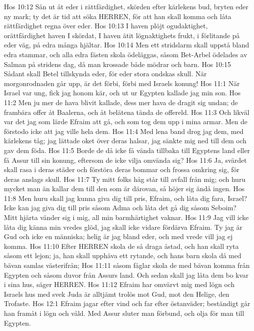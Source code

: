 Hos 10:12  Sån ut åt eder i rättfärdighet, skörden efter kärlekens bud, bryten eder ny mark; ty det är tid att söka HERREN, för att han skall komma och låta rättfärdighet regna över eder.
Hos 10:13  I haven plöjt ogudaktighet, orättfärdighet haven I skördat, I haven ätit lögnaktighets frukt, i förlitande på eder väg, på edra många hjältar.
Hos 10:14  Men ett stridslarm skall uppstå bland edra stammar, och alla edra fästen skola ödeläggas, såsom Bet-Arbel ödelades av Salman på stridens dag, då man krossade både mödrar och barn.
Hos 10:15  Sådant skall Betel tillskynda eder, för eder stora ondskas skull. När morgonrodnaden går upp, är det förbi, förbi med Israels konung!
Hos 11:1  När Israel var ung, fick jag honom kär, och ut ur Egypten kallade jag min son.
Hos 11:2  Men ju mer de hava blivit kallade, dess mer hava de dragit sig undan; de frambära offer åt Baalerna, och åt belätena tända de offereld.
Hos 11:3  Och likväl var det jag som lärde Efraim att gå, och som tog dem upp i mina armar. Men de förstodo icke att jag ville hela dem.
Hos 11:4  Med lena band drog jag dem, med kärlekens tåg; jag lättade oket över deras halsar, jag sänkte mig ned till dem och gav dem föda.
Hos 11:5  Borde de då icke få vända tillbaka till Egyptens land eller få Assur till sin konung, eftersom de icke vilja omvända sig?
Hos 11:6  Ja, svärdet skall rasa i deras städer och förstöra deras bommar och frossa omkring sig, för deras anslags skull.
Hos 11:7  Ty mitt folks håg står till avfall från mig; och huru mycket man än kallar dem till den som är därovan, så höjer sig ändå ingen.
Hos 11:8  Men huru skall jag kunna giva dig till pris, Efraim, och låta dig fara, Israel? Icke kan jag giva dig till pris såsom Adma och låta det gå dig såsom Seboim? Mitt hjärta vänder sig i mig, all min barmhärtighet vaknar.
Hos 11:9  Jag vill icke låta dig känna min vredes glöd, jag skall icke vidare fördärva Efraim. Ty jag är Gud och icke en människa; helig är jag bland eder, och med vrede vill jag ej komma.
Hos 11:10  Efter HERREN skola de så draga åstad, och han skall ryta såsom ett lejon; ja, han skall upphäva ett rytande, och hans barn skola då med bävan samlas västerifrån;
Hos 11:11  såsom fåglar skola de med bävan komma från Egypten och såsom duvor från Assurs land. Och sedan skall jag låta dem bo kvar i sina hus, säger HERREN.
Hos 11:12  Efraim har omvärvt mig med lögn och Israels hus med svek Juda är alltjämt trolös mot Gud, mot den Helige, den Trofaste.
Hos 12:1  Efraim jagar efter vind och far efter östanväder; beständigt går han framåt i lögn och våld. Med Assur sluter man förbund, och olja för man till Egypten.
